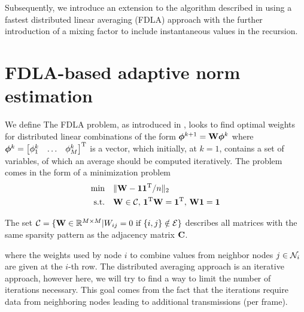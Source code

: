 \documentclass{article}
\begin{document}
Subsequently, we introduce an extension to the algorithm described in \cite{blochbergerDBSI} using a fastest distributed linear averaging (FDLA) approach \cite{xiaoFastLinearIterations2004} with the further introduction of a mixing factor to include instantaneous values in the recursion.

\section{FDLA-based adaptive norm estimation}
\label{sec:adaptivenormest}
We define 
The FDLA problem, as introduced in \cite{xiaoFastLinearIterations2004}, looks to find optimal weights for distributed linear combinations of the form \(\bm{\phi}^{k+1} = \bm{\mathrm{W}} \bm{\phi}^{k}\) where \(\bm{\phi}^k = \begin{bmatrix} \phi_1^k & \ldots & \phi_M^k \end{bmatrix}^{\mathrm{T}}\) is a vector, which initially, at \(k=1\), contains a set of variables, of which an average should be computed iteratively.
The problem comes in the form of a minimization problem
\begin{equation}
  \begin{aligned}
    \min& \quad \| \bm{\mathrm{W}} - \bm{1}\bm{1}^{\mathrm{T}}/n\|_2\\
    \text{s.t.}& \quad \bm{\mathrm{W}} \in \mathcal{C},\, \bm{1}^{\mathrm{T}} \bm{\mathrm{W}} = \bm{1}^{\mathrm{T}},\, \bm{\mathrm{W}} \bm{1}= \bm{1}
  \end{aligned}
\end{equation}

The set \(\mathcal{C} = \{\bm{\mathrm{W}} \in \mathbb{R}^{M \times M} \vert W_{ij} = 0 \text{ if } \{i,j\} \notin \mathcal{E}\}\) describes all matrices with the same sparsity pattern as the adjacency matrix \(\bm{\mathrm{C}}\).



where the weights used by node \(i\) to combine values from neighbor nodes \(j \in \mathcal{N}_i\) are given at the \(i\)-th row. The distributed averaging approach is an iterative approach, however here, we will try to find a way to limit the number of iterations necessary. This goal comes from the fact that the iterations require data from neighboring nodes leading to additional transmissions (per frame).
\end{document}
